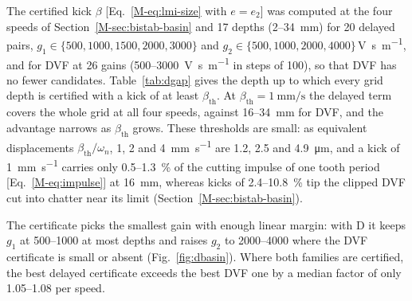 The certified kick $\beta$ [Eq.~\eqref{M-eq:lmi-size} with $e=e_2$] was computed at the four speeds of Section~\ref{M-sec:bistab-basin} and 17 depths (2--\SI{34}{\milli\metre}) for 20 delayed pairs, $g_1\in\{500,1000,1500,2000,3000\}$ and $g_2\in\{500,1000,2000,4000\}$\,\si{\volt\second\per\metre}, and for DVF at 26 gains (500--\SI{3000}{\volt\second\per\metre} in steps of 100), so that DVF has no fewer candidates. Table~\ref{tab:dgap} gives the depth up to which every grid depth is certified with a kick of at least $\beta_{\mathrm{th}}$. At $\beta_{\mathrm{th}}=\SI{1}{\milli\metre\per\second}$ the delayed term covers the whole grid at all four speeds, against 16--\SI{34}{\milli\metre} for DVF, and the advantage narrows as $\beta_{\mathrm{th}}$ grows. These thresholds are small: as equivalent displacements $\beta_{\mathrm{th}}/\omega_n$, 1, 2 and \SI{4}{\milli\metre\per\second} are 1.2, 2.5 and \SI{4.9}{\micro\metre}, and a kick of \SI{1}{\milli\metre\per\second} carries only 0.5--\SI{1.3}{\percent} of the cutting impulse of one tooth period [Eq.~\eqref{M-eq:impulse}] at \SI{16}{\milli\metre}, whereas kicks of 2.4--\SI{10.8}{\percent} tip the clipped DVF cut into chatter near its limit (Section~\ref{M-sec:bistab-basin}).

The certificate picks the smallest gain with enough linear margin: with D it keeps $g_1$ at 500--1000 at most depths and raises $g_2$ to 2000--4000 where the DVF certificate is small or absent (Fig.~\ref{fig:dbasin}). Where both families are certified, the best delayed certificate exceeds the best DVF one by a median factor of only 1.05--1.08 per speed.

